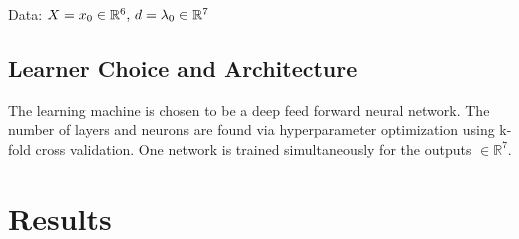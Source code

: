 \documentclass[10pt,a4paper]{article}
\begin{document}
Data: $X = x_0 \in\mathbb{R}^6\\,\, d = \lambda_0\in\mathbb{R}^7$

\subsection{Learner Choice and Architecture}
The learning machine is chosen to be a deep feed forward neural network. The number of layers and neurons are found via hyperparameter optimization using k-fold cross validation. One network is trained simultaneously for the outputs $\in\mathbb{R}^7$. 
	
\section{Results}	
	
	\begin{thebibliography}{1}
 
	\end{thebibliography}
\end{document}
